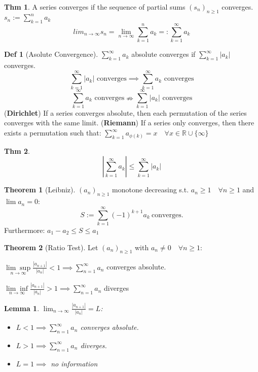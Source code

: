\documentclass[a4paper, 10pt]{article}
\newtheorem*{lemma}{Lemma}
\theoremstyle{definition}
\newtheorem*{theorem}{Thm}
\newtheorem*{definition}{Def}
\theoremstyle{named}
\newtheorem*{ntheorem_wrapper}{Theorem}
\newenvironment{ntheorem}%
    {\begin{mdframed}[style=important]\begin{ntheorem_wrapper}}%
    {\end{ntheorem_wrapper}\end{mdframed}}
\newcommand{\R}{\mathbb{R}}
\begin{document}
\begin{theorem}
    A series converges if the sequence of partial sums $(s_n)_{n \geq 1}$ converges. $s_n := \sum_{k = 1}^n a_k$
    $$lim_{n \to \infty} s_n = \lim_{n \to \infty} \sum_{k = 1}^n a_k =: \sum_{k=1}^\infty a_k$$
\end{theorem}

\begin{definition}[Asolute Convergence]
    $\sum_{k=1}^\infty a_k$ absolute converges if $\sum_{k=1}^\infty |a_k|$ converges.
    $$\sum_{k = 1}^\infty |a_k| \text{ converges} \implies \sum_{k=1}^\infty a_k \text{ converges}$$
    $$\sum_{k=1}^\infty a_k \text{ converges} \nRightarrow \sum_{k=1}^\infty |a_k| \text{ converges}$$
    (\textbf{Dirichlet}) If a series converges absolute, then each permutation of the series converges with the same limit.
    (\textbf{Riemann}) If a series only converges, then there exists a permutation such that: \newline $\sum_{k=1}^\infty a_{\phi(k)} = x \quad \forall x \in \R \cup \{\infty\}$
\end{definition}

\begin{theorem}
    $$\left|\sum_{k=1}^\infty a_k\right| \leq \sum_{k=1}^\infty |a_k|$$
\end{theorem}

\begin{ntheorem}[Leibniz]
    $(a_n)_{n\geq1}$ monotone decreasing s.t. $a_n \geq 1 \quad \forall n \geq 1$ and $\lim a_n = 0$:
    $$S := \sum_{k=1}^\infty (-1)^{k + 1} a_k \ \text{converges.}$$
    Furthermore: $a_1 - a_2 \leq S \leq a_1$
    
\end{ntheorem}

\begin{ntheorem}[Ratio Test]
    Let $(a_n)_{n \geq 1}$ with $a_n \neq 0 \quad \forall n\geq 1$:
    
    $\underset{n\to\infty}{\lim\sup} \frac{|a_{n+1}|}{|a_n|} < 1 \implies \sum_{n=1}^\infty a_n$ converges absolute.

    $\underset{n\to\infty}{\lim\inf} \frac{|a_{n+1}|}{|a_n|} > 1 \implies \sum_{n=1}^\infty a_n$ diverges
\end{ntheorem}

\begin{lemma}
    $\lim_{n\to\infty} \frac{|a_{n+1}|}{|a_n|} = L$:

    \begin{itemize}
        \item $L < 1 \implies \sum_{n=1}^\infty a_n$ converges absolute.
        \item $L > 1 \implies \sum_{n=1}^\infty a_n$ diverges.
        \item $L = 1 \implies$ no information
    \end{itemize}
\end{lemma}
\end{document}
